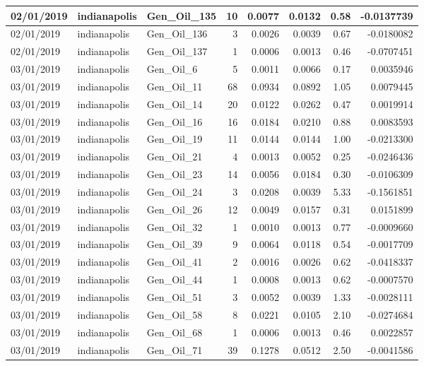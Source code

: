\documentclass[
  letterpaper,
  DIV=11,
  numbers=noendperiod]{scrartcl}
\begin{document}
\begin{tabular}{l|l|l|r|r|r|r|r}
\hline
02/01/2019 & indianapolis & Gen\_Oil\_135 & 10 & 0.0077 & 0.0132 & 0.58 & -0.0137739\\
\hline
02/01/2019 & indianapolis & Gen\_Oil\_136 & 3 & 0.0026 & 0.0039 & 0.67 & -0.0180082\\
\hline
02/01/2019 & indianapolis & Gen\_Oil\_137 & 1 & 0.0006 & 0.0013 & 0.46 & -0.0707451\\
\hline
03/01/2019 & indianapolis & Gen\_Oil\_6 & 5 & 0.0011 & 0.0066 & 0.17 & 0.0035946\\
\hline
03/01/2019 & indianapolis & Gen\_Oil\_11 & 68 & 0.0934 & 0.0892 & 1.05 & 0.0079445\\
\hline
03/01/2019 & indianapolis & Gen\_Oil\_14 & 20 & 0.0122 & 0.0262 & 0.47 & 0.0019914\\
\hline
03/01/2019 & indianapolis & Gen\_Oil\_16 & 16 & 0.0184 & 0.0210 & 0.88 & 0.0083593\\
\hline
03/01/2019 & indianapolis & Gen\_Oil\_19 & 11 & 0.0144 & 0.0144 & 1.00 & -0.0213300\\
\hline
03/01/2019 & indianapolis & Gen\_Oil\_21 & 4 & 0.0013 & 0.0052 & 0.25 & -0.0246436\\
\hline
03/01/2019 & indianapolis & Gen\_Oil\_23 & 14 & 0.0056 & 0.0184 & 0.30 & -0.0106309\\
\hline
03/01/2019 & indianapolis & Gen\_Oil\_24 & 3 & 0.0208 & 0.0039 & 5.33 & -0.1561851\\
\hline
03/01/2019 & indianapolis & Gen\_Oil\_26 & 12 & 0.0049 & 0.0157 & 0.31 & 0.0151899\\
\hline
03/01/2019 & indianapolis & Gen\_Oil\_32 & 1 & 0.0010 & 0.0013 & 0.77 & -0.0009660\\
\hline
03/01/2019 & indianapolis & Gen\_Oil\_39 & 9 & 0.0064 & 0.0118 & 0.54 & -0.0017709\\
\hline
03/01/2019 & indianapolis & Gen\_Oil\_41 & 2 & 0.0016 & 0.0026 & 0.62 & -0.0418337\\
\hline
03/01/2019 & indianapolis & Gen\_Oil\_44 & 1 & 0.0008 & 0.0013 & 0.62 & -0.0007570\\
\hline
03/01/2019 & indianapolis & Gen\_Oil\_51 & 3 & 0.0052 & 0.0039 & 1.33 & -0.0028111\\
\hline
03/01/2019 & indianapolis & Gen\_Oil\_58 & 8 & 0.0221 & 0.0105 & 2.10 & -0.0274684\\
\hline
03/01/2019 & indianapolis & Gen\_Oil\_68 & 1 & 0.0006 & 0.0013 & 0.46 & 0.0022857\\
\hline
03/01/2019 & indianapolis & Gen\_Oil\_71 & 39 & 0.1278 & 0.0512 & 2.50 & -0.0041586\\

\end{tabular}
\end{document}
